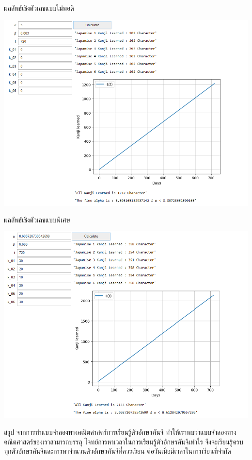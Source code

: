 \documentclass{beamer}
\begin{document}
\begin{frame}{ผลลัพธ์เชิงตัวเลขแบบไม่พอดี} 
\begin{center}
\includegraphics[scale = 0.3]{5.png}
\end{center}
\end{frame}

\begin{frame}{ผลลัพธ์เชิงตัวเลขแบบพิเศษ} 
\begin{center}
\includegraphics[scale = 0.3]{6.png}
\end{center}
\end{frame}

\begin{frame} {สรุป}
จากการทำแบบจำลองทางคณิตศาสตร์การเรียนรู้ตัวอักษรคันจิ ทำให้เราพบว่าแบบจำลองทางคณิตศาสตร์ของเราสามารถบรรลุ โจทย์การหาเวลาในการเรียนรู้ตัวอักษรคันจิเท่าไร จึงจะเรียนรู้ครบทุกตัวอักษรคันจิและการหาจำนวนตัวอักษรคันจิที่ควรเรียน ต่อวันเมื่อมีเวลาในการเรียนที่จำกัด
\end{frame}
\end{document}
